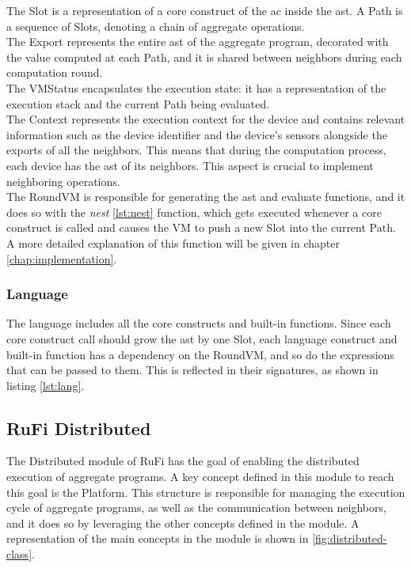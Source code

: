 The Slot is a representation of a core construct of the \ac{ac} inside the \ac{ast}. A Path is a sequence of Slots, denoting a chain of aggregate operations.\\
The Export represents the entire \ac{ast} of the aggregate program, decorated with the value computed at each Path, and it is shared between neighbors during each
computation round.\\
The VMStatus encapsulates the execution state: it has a representation of the execution stack and the current Path being evaluated.\\
The Context represents the execution context for the device and contains relevant information such as the device identifier and the device's sensors alongside the exports of all the neighbors.
This means that during the computation process, each device has the \ac{ast} of its neighbors. This aspect is crucial to implement neighboring operations.\\
The RoundVM is responsible for generating the \ac{ast} and evaluate functions, and it does so with the \textit{nest} \ref{lst:nest} function, which gets executed whenever a core construct is called
and causes the VM to push a new Slot into the current Path. A more detailed explanation of this function will be given in chapter \ref{chap:implementation}.

\subsubsection{Language}
The language includes all the core constructs and built-in functions. Since each core construct call should grow the \ac{ast} by one Slot, each language construct and built-in function has
a dependency on the RoundVM, and so do the expressions that can be passed to them. This is reflected in their signatures, as shown in listing \ref{lst:lang}.



\subsection{RuFi Distributed}
The Distributed module of RuFi has the goal of enabling the distributed execution of aggregate programs. A key concept defined in this module to reach this goal is the Platform.
This structure is responsible for managing the execution cycle of aggregate programs, as well as the communication between neighbors, and it does so by leveraging the other concepts defined in the module.
A representation of the main concepts in the module is shown in \cref{fig:distributed-class}.

